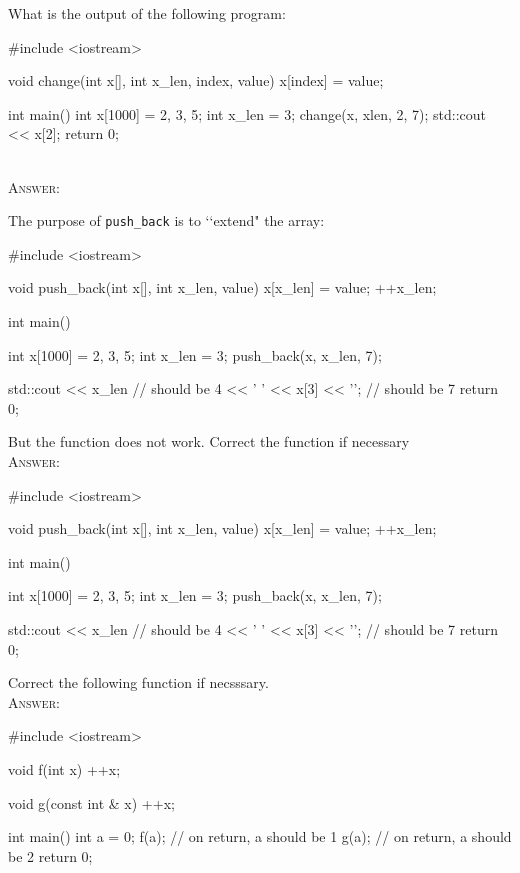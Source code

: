 

\renewcommand\AUTHOR{jdoe5@cougars.ccis.edu} %


\topmattertwo


\nextq
What is the output of the following program:
\begin{console}[fontsize=\footnotesize]
#include <iostream>

void change(int x[], int x_len, index, value)
{
    x[index] = value;
}

int main()
{
    int x[1000] = {2, 3, 5};
    int x_len = 3;
    change(x, xlen, 2, 7);
    std::cout << x[2];
    return 0;
}
\end{console}
\\
\textsc{Answer:}\vspace{-2mm}
\begin{answercode}

\end{answercode}

\nextq
The purpose of \verb!push_back! is to \lq\lq extend" the array:
\begin{console}[fontsize=\footnotesize]
#include <iostream>

void push_back(int x[], int x_len, value)
{
    x[x_len] = value;
    ++x_len;
}

int main()
{
    int x[1000] = {2, 3, 5};
    int x_len = 3;
    push_back(x, x_len, 7);

    std::cout << x_len           // should be 4
              << ' '        
              << x[3] << '\n';   // should be 7
    return 0;
}
\end{console}
But the function does not work.
Correct the function if necessary
\\
\textsc{Answer:}\vspace{-2mm}
\begin{answercode}
#include <iostream>

void push_back(int x[], int x_len, value)
{
    x[x_len] = value;
    ++x_len;
}

int main()
{
    int x[1000] = {2, 3, 5};
    int x_len = 3;
    push_back(x, x_len, 7);

    std::cout << x_len           // should be 4
              << ' '        
              << x[3] << '\n';   // should be 7
    return 0;
}
\end{answercode}

\nextq
Correct the following function if necsssary.
\\
\textsc{Answer:}\vspace{-2mm}
\begin{answercode}
#include <iostream>

void f(int x)
{
    ++x;
}

void g(const int & x)
{
    ++x;
}

int main()
{
    int a = 0;
    f(a);      // on return, a should be 1
    g(a);      // on return, a should be 2
    return 0;
}
\end{answercode}

